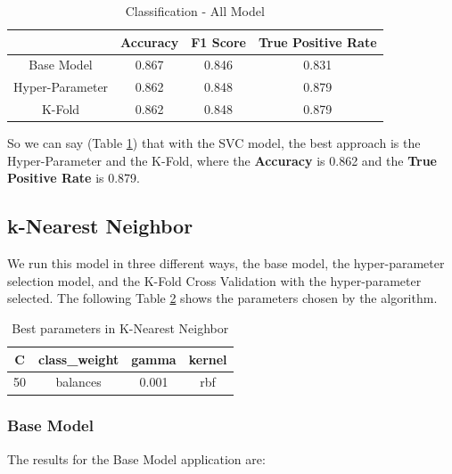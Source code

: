 \documentclass[conference]{IEEEtran}
\begin{document}
\begin{table}[ht!]
    \centering
    \caption{Classification - All Model} 
    \begin{tabular}{||c| c c c||} 
    \hline
     & Accuracy & F1 Score & True Positive Rate \\ [0.5ex] 
     \hline\hline
     Base Model & 0.867 & 0.846 & 0.831 \\
     \hline
    Hyper-Parameter & 0.862 & 0.848 & 0.879 \\ 
    \hline
    K-Fold & 0.862 & 0.848 & 0.879 \\ 
    \hline
    \end{tabular}
    \label{tab:tab-final-svc}
\end{table}

So we can say (Table \ref{tab:tab-final-svc}) that with the SVC model, the best approach is the Hyper-Parameter and the K-Fold, where the \textbf{Accuracy} is 0.862 and the \textbf{True Positive Rate} is 0.879.

\subsection{k-Nearest Neighbor}

We run this model in three different ways, the base model, the hyper-parameter selection model, and the K-Fold Cross Validation with the hyper-parameter selected. The following Table \ref{tab:tab5} shows the parameters chosen by the algorithm.

\begin{table}[h!]
    \centering
    \begin{tabular}{||c c c c||} 
     \hline
     C & class_weight & gamma & kernel \\[0.5ex] 
     \hline\hline
     50 & balances & 0.001 & rbf \\ 
    \hline
    \end{tabular}
    \caption{Best parameters in K-Nearest Neighbor} 
    \label{tab:tab5}
\end{table}

\subsubsection{Base Model}
The results for the Base Model application are:
\end{document}
